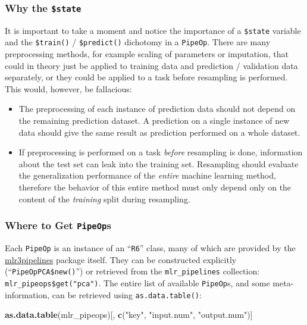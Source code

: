 \documentclass[]{scrbook}
\newenvironment{Shaded}{\begin{snugshade}}{\end{snugshade}}
\newcommand{\KeywordTok}[1]{\textcolor[rgb]{0.13,0.29,0.53}{\textbf{#1}}}
\newcommand{\NormalTok}[1]{#1}
\newcommand{\StringTok}[1]{\textcolor[rgb]{0.31,0.60,0.02}{#1}}
\providecommand{\tightlist}{%
  \setlength{\itemsep}{0pt}\setlength{\parskip}{0pt}}
\renewenvironment{Shaded} {\begin{snugshade}\small} {\end{snugshade}}
\begin{document}
\hypertarget{why-the-state}{%
\subsubsection{\texorpdfstring{Why the \texttt{\$state}}{Why the \$state}}\label{why-the-state}}

It is important to take a moment and notice the importance of a \texttt{\$state} variable and the \texttt{\$train()} / \texttt{\$predict()} dichotomy in a \texttt{PipeOp}.
There are many preprocessing methods, for example scaling of parameters or imputation, that could in theory just be applied to training data and prediction / validation data separately, or they could be applied to a task before resampling is performed.
This would, however, be fallacious:

\begin{itemize}
\tightlist
\item
  The preprocessing of each instance of prediction data should not depend on the remaining prediction dataset.
  A prediction on a single instance of new data should give the same result as prediction performed on a whole dataset.
\item
  If preprocessing is performed on a task \emph{before} resampling is done, information about the test set can leak into the training set.
  Resampling should evaluate the generalization performance of the \emph{entire} machine learning method, therefore the behavior of this entire method must only depend only on the content of the \emph{training} split during resampling.
\end{itemize}

\hypertarget{where-to-get-pipeops}{%
\subsubsection{\texorpdfstring{Where to Get \texttt{PipeOp}s}{Where to Get PipeOps}}\label{where-to-get-pipeops}}

Each \texttt{PipeOp} is an instance of an ``\texttt{R6}'' class, many of which are provided by the \href{https://cran.r-project.org/package=mlr3pipelines}{mlr3pipelines} package itself.
They can be constructed explicitly (``\texttt{PipeOpPCA\$new()}'') or retrieved from the \texttt{mlr\_pipelines} collection: \texttt{mlr\_pipeops\$get("pca")}.
The entire list of available \texttt{PipeOp}s, and some meta-information, can be retrieved using \texttt{as.data.table()}:

\begin{Shaded}
\begin{Highlighting}[]
\KeywordTok{as.data.table}\NormalTok{(mlr_pipeops)[, }\KeywordTok{c}\NormalTok{(}\StringTok{"key"}\NormalTok{, }\StringTok{"input.num"}\NormalTok{, }\StringTok{"output.num"}\NormalTok{)]}
\end{Highlighting}
\end{Shaded}
\end{document}

